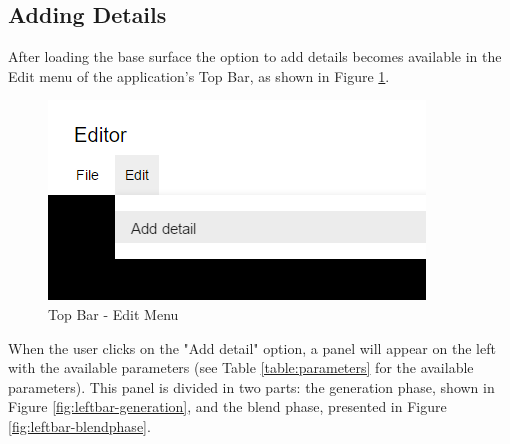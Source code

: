   \newpage
  
  \subsection {Adding Details}
  
    After loading the base surface the option to add details becomes available in the Edit menu of the application's Top Bar, as shown in Figure \ref{fig:topbar-editmenu}. 
  
    \begin{figure}[H]
      \centering
      \includegraphics[width=\imagewidth]{images/screenshots/TopBar-EditMenu}
      \caption{Top Bar - Edit Menu}
      \label{fig:topbar-editmenu}
    \end{figure}
    
    When the user clicks on the "Add detail" option, a panel will appear on the left with the available parameters (see Table \ref{table:parameters} for the available parameters). This panel is divided in two parts: the generation phase, shown in Figure \ref{fig:leftbar-generation}, and the blend phase, presented in Figure \ref{fig:leftbar-blendphase}.
    
